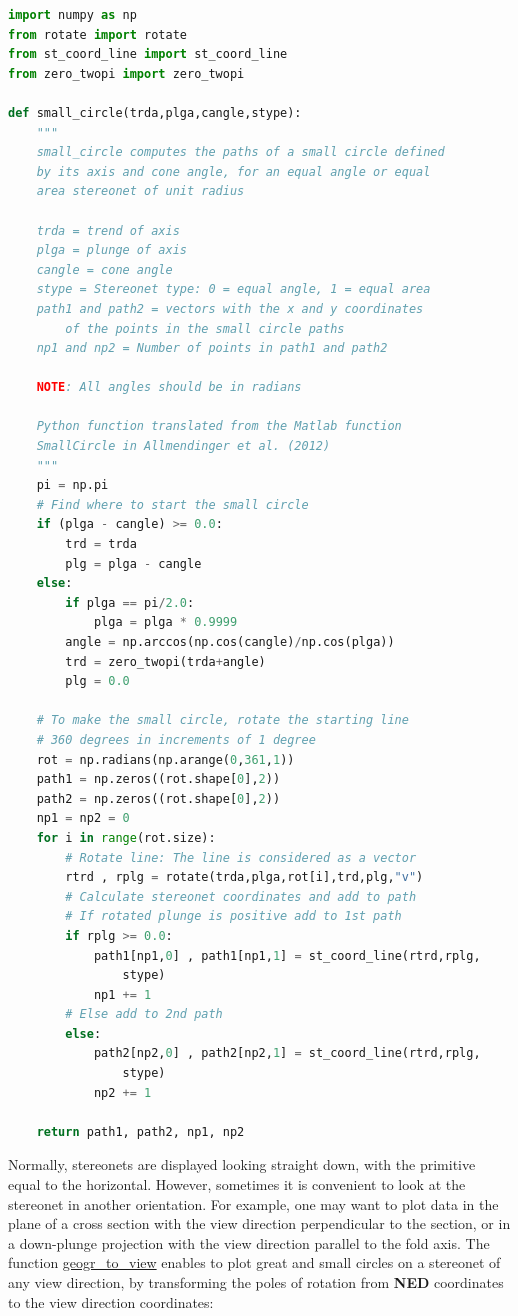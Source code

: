 \documentclass[a4paper , 12pt]{book}
\begin{document}
\begin{center}
\begin{lstlisting}[language=Python, frame=single]
import numpy as np
from rotate import rotate
from st_coord_line import st_coord_line
from zero_twopi import zero_twopi

def small_circle(trda,plga,cangle,stype):
	"""
	small_circle computes the paths of a small circle defined
	by its axis and cone angle, for an equal angle or equal
	area stereonet of unit radius
	
	trda = trend of axis
	plga = plunge of axis
	cangle = cone angle
	stype = Stereonet type: 0 = equal angle, 1 = equal area
	path1 and path2 = vectors with the x and y coordinates
		of the points in the small circle paths
	np1 and np2 = Number of points in path1 and path2
	
	NOTE: All angles should be in radians
	
	Python function translated from the Matlab function
	SmallCircle in Allmendinger et al. (2012)
	"""
	pi = np.pi
	# Find where to start the small circle
	if (plga - cangle) >= 0.0:
		trd = trda
		plg = plga - cangle
	else:
		if plga == pi/2.0:
			plga = plga * 0.9999
		angle = np.arccos(np.cos(cangle)/np.cos(plga))
		trd = zero_twopi(trda+angle)
		plg = 0.0
	
	# To make the small circle, rotate the starting line
	# 360 degrees in increments of 1 degree
	rot = np.radians(np.arange(0,361,1))
	path1 = np.zeros((rot.shape[0],2))
	path2 = np.zeros((rot.shape[0],2))
	np1 = np2 = 0
	for i in range(rot.size):
		# Rotate line: The line is considered as a vector
		rtrd , rplg = rotate(trda,plga,rot[i],trd,plg,"v")
		# Calculate stereonet coordinates and add to path
		# If rotated plunge is positive add to 1st path
		if rplg >= 0.0:
			path1[np1,0] , path1[np1,1] = st_coord_line(rtrd,rplg,
				stype)
			np1 += 1
		# Else add to 2nd path
		else:
			path2[np2,0] , path2[np2,1] = st_coord_line(rtrd,rplg,
				stype)
			np2 += 1
	
	return path1, path2, np1, np2
\end{lstlisting}
\end{center}

Normally, stereonets are displayed looking straight down,  with the primitive equal to the horizontal. However, sometimes it is convenient to look at the stereonet in another orientation. For example, one may want to plot data in the plane of a cross section with the view direction perpendicular to the section, or in a down-plunge projection with the view direction parallel to the fold axis. The function \href{https://github.com/nfcd/compGeo/blob/master/source/functions/geogr_to_view.py}{geogr\_to\_view} enables to plot great and small circles on a stereonet of any view direction, by transforming the poles of rotation from \textbf{NED} coordinates to the view direction coordinates:
\end{document}
